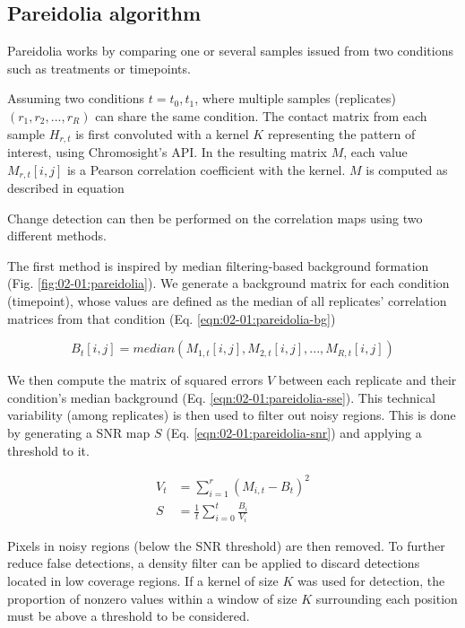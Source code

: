 \subsection{Pareidolia algorithm}

Pareidolia works by comparing one or several samples issued from two conditions such as treatments or timepoints.

Assuming two conditions $t={t_0, t_1}$, where multiple samples (replicates) $(r_1, r_2, ..., r_R)$ can share the same condition. The contact matrix from each sample $H_{r, t}$ is first convoluted with a kernel $K$ representing the pattern of interest, using Chromosight's \acrshort{API}. In the resulting matrix $M$, each value $M_{r, t}[i, j]$ is a Pearson correlation coefficient with the kernel. $M$ is computed as described in equation

Change detection can then be performed on the correlation maps using two different methods.

The first method is inspired by median filtering-based background formation (Fig. \ref{fig:02-01:pareidolia}). We generate a background matrix for each condition (timepoint), whose values are defined as the median of all replicates' correlation matrices from that condition (Eq. \ref{eqn:02-01:pareidolia-bg}) 

\begin{equation}
    \label{eqn:02-01:pareidolia-bg}
    B_t[i, j] = median(M_{1, t}[i, j], M_{2, t}[i, j], ..., M_{R, t}[i, j])
\end{equation}

We then compute the matrix of squared errors $V$ between each replicate and their condition's median background (Eq. \ref{eqn:02-01:pareidolia-sse}). This technical variability (among replicates) is then used to filter out noisy regions. This is done by generating a \acrfull{SNR} map $S$ (Eq. \ref{eqn:02-01:pareidolia-snr}) and applying a threshold to it.

\begin{align}
    \label{eqn:02-01:pareidolia-sse}
    V_t &= \sum_{i=1}^r{(M_{i, t} - B_t)^2} \\
    \label{eqn:02-01:pareidolia-snr}
    S &= \frac{1}{t} \sum_{i=0}^t{\frac{B_i}{V_i}}
\end{align}

Pixels in noisy regions (below the \acrshort{SNR} threshold) are then removed. To further reduce false detections, a density filter can be applied to discard detections located in low coverage regions. If a kernel of size $K$ was used for detection, the proportion of nonzero values within a window of size $K$ surrounding each position must be above a threshold to be considered.

